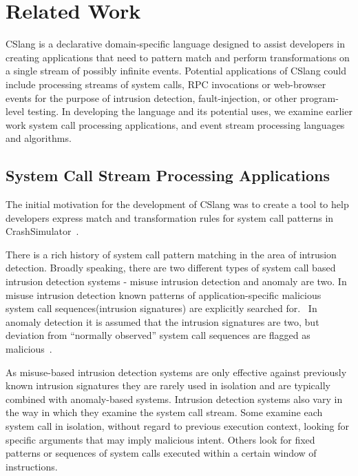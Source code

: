 \section{Related Work}
\label{SEC:related-work}

CSlang is a declarative domain-specific language designed to
assist developers in creating
applications that need to pattern match and perform
transformations on a single stream of possibly infinite events.
Potential applications
of CSlang could include
processing streams of system calls, RPC invocations or
web-browser events for the purpose of intrusion detection, fault-injection, or
other program-level testing.
In developing the language and its potential uses,
we examine
earlier work system call processing applications,
and event stream processing languages and algorithms.

\subsection{System Call Stream Processing Applications}
The
initial motivation for the development of CSlang was to create a tool to help
developers express match and transformation rules for system call patterns in
CrashSimulator~\cite{DBLP:conf/issre/MooreCFW19}.

There is a rich history of system call pattern
matching in the area of intrusion detection.  Broadly speaking, there are two
different types of system call based intrusion detection systems - misuse
intrusion detection and anomaly are two. In misuse intrusion
detection known patterns of application-specific malicious system call
sequences(intrusion signatures) are explicitly searched
for.~\cite{GARCIATEODORO200918}
In anomaly
detection it is assumed that the intrusion signatures are two, but deviation
from “normally observed” system call sequences are flagged as
malicious~\cite{DBLP:conf/sp/ForrestHSL96}.

As misuse-based intrusion detection systems are only
effective against previously known intrusion signatures they are rarely used in
isolation and are typically combined with anomaly-based systems.
Intrusion
detection systems also vary in the way in which they examine the system call
stream.
Some examine each system call in isolation,
without regard to previous
execution context,
looking for specific arguments that may imply malicious
intent.
Others look for fixed patterns or sequences of system calls executed
within a certain window of instructions.

